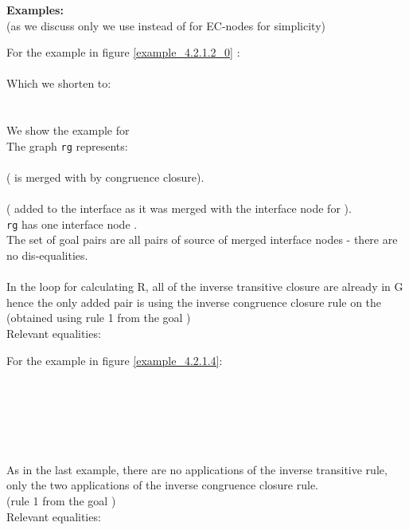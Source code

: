 \bigskip

\noindent
\textbf{Examples:}\\
(as we discuss only  we use \m{[.]} instead of  for EC-nodes for simplicity)

\noindent
For the example in figure \ref{example_4.2.1.2_0} :\\
\\
Which we shorten to:\\
\\
\\
We show the example for \\
The graph \lstinline|rg| represents:\\
\\
(\m{\textcolor{red}{y}} is merged with  by congruence closure).\\
\\
(\m{\textcolor{red}{y}} added to the interface as it was merged with the interface node for ).\\
\lstinline|rg| has one interface node .\\
The set of goal pairs are all pairs of source of merged interface nodes - there are no dis-equalities.\\
\\
In the loop for calculating R, all of the inverse transitive closure are already in G hence the only added pair is
\m{\s{[a],[b]}} using the inverse congruence closure rule on the \GFAs{} 
 (obtained using rule 1 from the goal )\\
Relevant equalities:\\
\s{[a]=[b]}

\bigskip

\noindent
For the example in figure \ref{example_4.2.1.4}:\\
\\
\\
\\
\\
\\
\\
As in the last example, there are no applications of the inverse transitive rule, only the two applications of the inverse congruence closure rule.\\
 (rule 1 from the goal )\\
Relevant equalities:\\
\s{[a]=[b],[c]=[d]}

